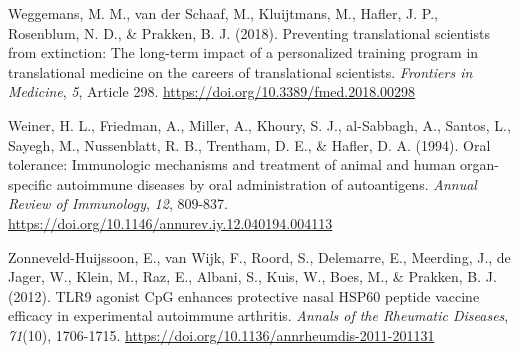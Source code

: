 \documentclass[authordate, editorial]{jote-new-article}
\begin{document}
	Weggemans, M. M., van der Schaaf, M., Kluijtmans, M., Hafler, J. P., Rosenblum, N. D., \& Prakken, B. J. (2018). Preventing translational scientists from extinction: The long-term impact of a personalized training program in translational medicine on the careers of translational scientists. \emph{Frontiers in Medicine},\emph{ 5}, Article 298. \url{https://doi.org/10.3389/fmed.2018.00298}



	Weiner, H. L., Friedman, A., Miller, A., Khoury, S. J., al-Sabbagh, A., Santos, L., Sayegh, M., Nussenblatt, R. B., Trentham, D. E., \& Hafler, D. A. (1994). Oral tolerance: Immunologic mechanisms and treatment of animal and human organ-specific autoimmune diseases by oral administration of autoantigens. \emph{Annual Review of Immunology},\emph{ 12}, 809-837. \url{https://doi.org/10.1146/annurev.iy.12.040194.004113}



	Zonneveld-Huijssoon, E., van Wijk, F., Roord, S., Delemarre, E., Meerding, J., de Jager, W., Klein, M., Raz, E., Albani, S., Kuis, W., Boes, M., \& Prakken, B. J. (2012). TLR9 agonist CpG enhances protective nasal HSP60 peptide vaccine efficacy in experimental autoimmune arthritis. \emph{Annals of the Rheumatic Diseases},\emph{ 71}(10), 1706-1715. \url{https://doi.org/10.1136/annrheumdis-2011-201131}
\end{document}
